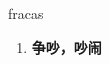 
\begin{frame}
{\huge fracas}
\begin{center}
\begin{enumerate}\Large
  \item \textbf{争吵，吵闹}
\end{enumerate}
\end{center}
\end{frame}
